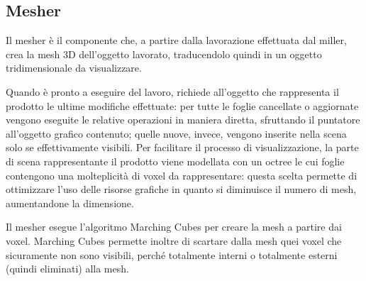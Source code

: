 \subsection{Mesher}
Il mesher è il componente che, a partire dalla lavorazione effettuata dal miller, crea la mesh 3D dell'oggetto lavorato, traducendolo quindi in un oggetto tridimensionale da visualizzare.

Quando è pronto a eseguire del lavoro, richiede all’oggetto che rappresenta il prodotto le ultime modifiche effettuate: per tutte le foglie cancellate o aggiornate vengono eseguite le relative operazioni in maniera diretta, sfruttando il puntatore all’oggetto grafico contenuto;  quelle nuove, invece, vengono inserite nella scena solo se effettivamente visibili. Per facilitare il processo di visualizzazione, la parte di scena rappresentante il prodotto viene modellata con un octree le cui foglie contengono una molteplicità di voxel da rappresentare: questa scelta permette di ottimizzare l’uso delle risorse grafiche in quanto si diminuisce il numero di mesh, aumentandone la dimensione.

Il mesher esegue l'algoritmo Marching Cubes per creare la mesh a partire dai voxel. Marching Cubes permette inoltre di scartare dalla mesh quei voxel che sicuramente non sono visibili, perché totalmente interni o totalmente esterni (quindi eliminati) alla mesh.


